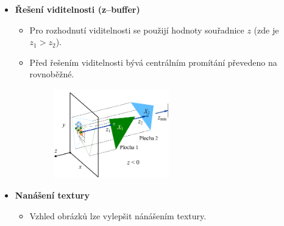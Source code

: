 \begin{itemize}
\begin{itemize}
\begin{figure}[H]
		\end{figure}
	\end{itemize}
	\item \textbf{Řešení viditelnosti (z--buffer)}
	\begin{itemize}
		\item Pro rozhodnutí viditelnosti se použijí hodnoty souřadnice $z$ (zde je $z_1 > z_2$).
		\item Před řešením viditelnosti bývá centrálním promítání převedeno na rovnoběžné.
		\begin{figure}[H]
		\centering
		\includegraphics[width=0.5\textwidth]{assets/5_pip_zbuffer}
		\end{figure}
	\end{itemize}
	\item \textbf{Nanášení textury}
	\begin{itemize}
		\item Vzhled obrázků lze vylepšit nánášením textury.
	\end{itemize}
\end{itemize}
